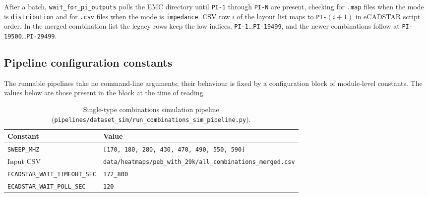 After a batch, \texttt{wait\_for\_pi\_outputs} polls the EMC directory until \texttt{PI-1} through
\texttt{PI-N} are present, checking for \texttt{.map} files when the mode is \texttt{distribution}
and for \texttt{.csv} files when the mode is \texttt{impedance}. CSV row $i$ of the layout list maps
to \texttt{PI-$(i+1)$} in eCADSTAR script order. In the merged combination list the legacy rows keep
the low indices, \texttt{PI-1}\ldots\texttt{PI-19499}, and the newer combinations follow at
\texttt{PI-19500}\ldots\texttt{PI-29499}.

\subsection{Pipeline configuration constants}
\label{subsec:appA_pipeline_config}

The runnable pipelines take no command-line arguments; their behaviour is fixed by a configuration
block of module-level constants. The values below are those present in the block at the time of
reading.

\begin{table}[htbp]
\centering
\caption{Single-type combinations simulation pipeline
(\texttt{pipelines/\allowbreak{}dataset\_\allowbreak{}sim/\allowbreak{}run\_\allowbreak{}combinations\_\allowbreak{}sim\_\allowbreak{}pipeline.py}).}
\label{tab:appA_comb_pipeline}
\begin{tabular}{p{} p{}}
\hline
Constant & Value \\
\hline
\texttt{SWEEP\_MHZ} & \texttt{[170, 180, 280, 430, 470, 490, 550, 590]} \\
Input CSV & \texttt{data/\allowbreak{}heatmaps/\allowbreak{}peb\_\allowbreak{}with\_\allowbreak{}29k/\allowbreak{}all\_\allowbreak{}combinations\_\allowbreak{}merged.csv} \\
\texttt{ECADSTAR\_WAIT\_TIMEOUT\_SEC} & \texttt{172\_800} \\
\texttt{ECADSTAR\_WAIT\_POLL\_SEC} & \texttt{120} \\
\hline
\end{tabular}
\end{table}


